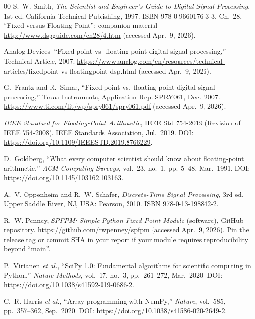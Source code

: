 \documentclass[conference]{IEEEtran}
\begin{document}
\begin{thebibliography}{00}
 S.~W. Smith, \emph{The Scientist and Engineer's Guide to Digital Signal Processing}, 1st ed. California Technical Publishing, 1997. ISBN 978-0-9660176-3-3. Ch.~28, ``Fixed versus Floating Point''; companion material \url{http://www.dspguide.com/ch28/4.htm} (accessed Apr.~9, 2026).

 Analog Devices, ``Fixed-point vs.\ floating-point digital signal processing,'' Technical Article, 2007. \url{https://www.analog.com/en/resources/technical-articles/fixedpoint-vs-floatingpoint-dsp.html} (accessed Apr.~9, 2026).

 G.~Frantz and R.~Simar, ``Fixed-point vs.\ floating-point digital signal processing,'' Texas Instruments, Application Rep. SPRY061, Dec.~2007. \url{https://www.ti.com/lit/wp/spry061/spry061.pdf} (accessed Apr.~9, 2026).

 \emph{IEEE Standard for Floating-Point Arithmetic}, IEEE Std 754-2019 (Revision of IEEE 754-2008). IEEE Standards Association, Jul.~2019. DOI: \url{https://doi.org/10.1109/IEEESTD.2019.8766229}.

 D.~Goldberg, ``What every computer scientist should know about floating-point arithmetic,'' \emph{ACM Computing Surveys}, vol.~23, no.~1, pp.~5--48, Mar.~1991. DOI: \url{https://doi.org/10.1145/103162.103163}.

 A.~V. Oppenheim and R.~W. Schafer, \emph{Discrete-Time Signal Processing}, 3rd ed. Upper Saddle River, NJ, USA: Pearson, 2010. ISBN 978-0-13-198842-2.

 R.~W. Penney, \emph{SPFPM: Simple Python Fixed-Point Module} (software), GitHub repository. \url{https://github.com/rwpenney/spfpm} (accessed Apr.~9, 2026). Pin the release tag or commit SHA in your report if your module requires reproducibility beyond ``main''.

 P.~Virtanen \emph{et al.}, ``SciPy 1.0: Fundamental algorithms for scientific computing in Python,'' \emph{Nature Methods}, vol.~17, no.~3, pp.~261--272, Mar.~2020. DOI: \url{https://doi.org/10.1038/s41592-019-0686-2}.

 C.~R. Harris \emph{et al.}, ``Array programming with NumPy,'' \emph{Nature}, vol.~585, pp.~357--362, Sep.~2020. DOI: \url{https://doi.org/10.1038/s41586-020-2649-2}.

\end{thebibliography}
\end{document}
